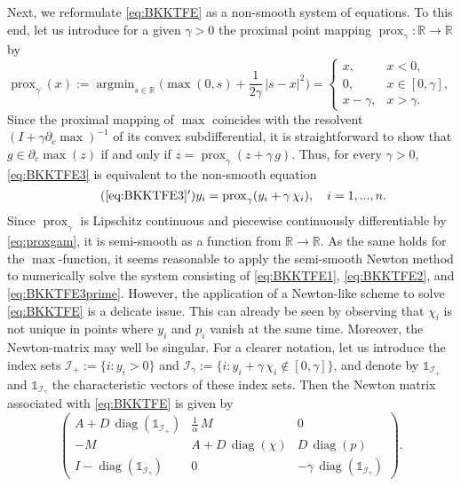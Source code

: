\documentclass[reqno]{shinyart}
\begin{document}
Next, we reformulate \eqref{eq:BKKTFE} as a non-smooth system of equations. 
To this end, let us introduce for a given $\gamma > 0$ the proximal point mapping 
${\operatorname{prox}}_\gamma: {\mathbb{R}}\to{\mathbb{R}}$ by 
\begin{equation}\label{eq:proxgam}
    {\operatorname{prox}}_\gamma(x) := {\operatorname{argmin}}_{s\in{\mathbb{R}}} \Big( \max(0,s) + \frac{1}{2\gamma} \, |s-x|^2 \Big)
    = \begin{cases}
        x, & x < 0,\\
        0, & x\in [0,\gamma], \\
        x - \gamma, & x > \gamma.
    \end{cases}
\end{equation}
Since the proximal mapping of $\max$ coincides with the resolvent $(I+\gamma\partial_c\max)^{-1}$ of its convex subdifferential, it is straightforward to show that $g\in \partial_c \max(z)$ if and only if 
$z = {\operatorname{prox}}_\gamma(z + \gamma \,g)$. Thus, for every $\gamma > 0$, 
\eqref{eq:BKKTFE3} is equivalent to the non-smooth equation 
\begin{equation}\tag{\ref{eq:BKKTFE3}$'$}\label{eq:BKKTFE3prime}
    y_i = {\operatorname{prox}}_\gamma(y_i + \gamma\,\chi_i), \quad i = 1, ..., n.
\end{equation}
Since ${\operatorname{prox}}_\gamma$ is Lipschitz continuous and piecewise continuously differentiable by \eqref{eq:proxgam}, 
it is semi-smooth as a function from ${\mathbb{R}}\to {\mathbb{R}}$. As the same holds for the $\max$-function, 
it seems reasonable to apply the semi-smooth Newton method to numerically solve
the system consisting of \eqref{eq:BKKTFE1}, \eqref{eq:BKKTFE2}, and \eqref{eq:BKKTFE3prime}.
However, the application of a Newton-like scheme to solve \eqref{eq:BKKTFE} is 
a delicate issue. This can already be seen by observing that $\chi_i$ is not unique in points where $y_i$ 
and $p_i$ vanish at the same time. Moreover, the Newton-matrix may well be singular. 
For a clearer notation, let us introduce the index sets ${\mathcal{I}}_+ := \{i : y_i > 0\}$
and ${\mathcal{I}}_\gamma := \{i: y_i + \gamma \, \chi_i \notin [0,\gamma]\}$, and denote by 
$\mathbb{1}_{{\mathcal{I}}_+}$ and $\mathbb{1}_{{\mathcal{I}}_\gamma}$ the characteristic vectors of these index sets. 
Then the Newton matrix associated with \eqref{eq:BKKTFE} is given by
\begin{equation*}
    \begin{pmatrix}
        A + D\, {\operatorname{diag}}(\mathbb{1}_{{\mathcal{I}}_+}) & \frac{1}{\alpha}\,M & 0 \\
        -M & A + D\, {\operatorname{diag}}(\chi) & D\,{\operatorname{diag}}(p) \\
        I - {\operatorname{diag}}(\mathbb{1}_{{\mathcal{I}}_\gamma}) & 0 & - \gamma\,{\operatorname{diag}}(\mathbb{1}_{{\mathcal{I}}_\gamma})
    \end{pmatrix}.
\end{equation*}
\end{document}
